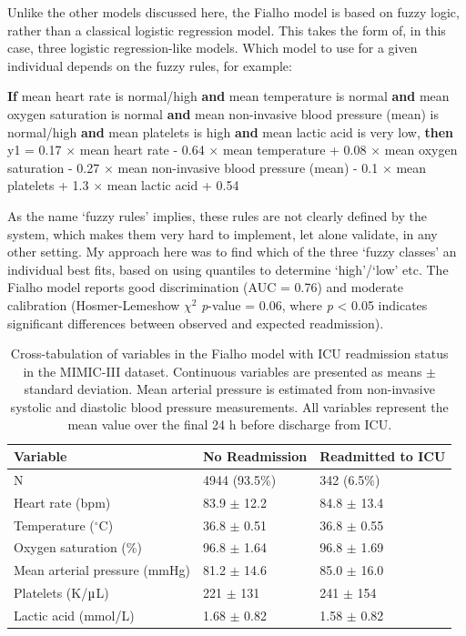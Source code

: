 \documentclass[onecolumn]{article}
\newenvironment{indentpar}[1]
  {\begin{list}{}
          {\setlength{\rightmargin}{#1}}
          \item[]
  }
  {\end{list}}
\begin{document}
Unlike the other models discussed here, the Fialho model is based on fuzzy logic, rather than a classical logistic regression model. This takes the form of, in this case, three logistic regression-like models. Which model to use for a given individual depends on the fuzzy rules, for example:

\begin{indentpar}{1cm}
\textbf{If} mean heart rate is normal/high \textbf{and} mean temperature is normal \textbf{and} mean oxygen saturation is normal \textbf{and} mean non-invasive blood pressure (mean) is normal/high \textbf{and} mean platelets is high \textbf{and} mean lactic acid is very low, \textbf{then} y1 = 0.17 $\times$ mean heart rate - 0.64 $\times$ mean temperature + 0.08 $\times$ mean oxygen saturation - 0.27 $\times$ mean non-invasive blood pressure (mean) - 0.1 $\times$ mean platelets + 1.3 $\times$ mean lactic acid + 0.54
\end{indentpar}

As the name `fuzzy rules' implies, these rules are not clearly defined by the system, which makes them very hard to implement, let alone validate, in any other setting. My approach here was to find which of the three `fuzzy classes' an individual best fits, based on using quantiles to determine `high'/`low' etc. The Fialho model reports good discrimination (AUC = 0.76) and moderate calibration (Hosmer-Lemeshow $ \chi^{2} $ \textit{p}-value = 0.06, where \textit{p} < 0.05 indicates significant differences between observed and expected readmission).

\begin{table}[h]
\centering
	\renewcommand{\arraystretch}{1.4}
		\caption{Cross-tabulation of variables in the Fialho model with ICU readmission status in the MIMIC-III dataset. Continuous variables are presented as means $\pm$ standard deviation. Mean arterial pressure is estimated from non-invasive systolic and diastolic blood pressure measurements. All variables represent the mean value over the final 24 h before discharge from ICU.}
	\begin{tabular}{lp{2.5cm}p{2cm}}
		\hline
		Variable & No Readmission & Readmitted to ICU\\
		\hline
		N & 4944 (93.5\%)  &      342 (6.5\%)\\
		Heart rate (bpm) & 83.9 $\pm$ 12.2 & 84.8 $\pm$ 13.4\\
		Temperature ($^\circ$C) & 36.8 $\pm$ 0.51 &  36.8 $\pm$ 0.55\\
		Oxygen saturation (\%) & 96.8 $\pm$ 1.64 & 96.8 $\pm$ 1.69\\
		Mean arterial pressure (mmHg) & 81.2 $\pm$ 14.6 & 85.0 $\pm$ 16.0\\
		Platelets (K/$\micro$L) & 221 $\pm$ 131 & 241 $\pm$ 154\\
		Lactic acid (mmol/L) & 1.68 $\pm$ 0.82 & 1.58 $\pm$ 0.82\\
		\hline
	\end{tabular}
	\label{Table1Fialho}
\end{table}
\end{document}
